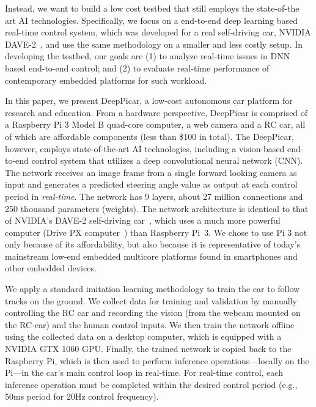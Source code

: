 Instead, we want to build a low cost testbed that still employs the
state-of-the art AI technologies. Specifically, we focus on a end-to-end
deep learning based real-time control system,
which was developed for a real self-driving car, NVIDIA
DAVE-2~\cite{Bojarski2016}, and use the same methodology on a
smaller and less costly setup. In developing the testbed, our
goals are (1) to analyze real-time issues in DNN based end-to-end
control; and (2) to evaluate real-time performance of contemporary embedded
platforms for such workload.

In this paper, we present DeepPicar, a low-cost autonomous car
platform for research and education. From a hardware perspective,
DeepPicar is comprised of a Raspberry Pi 3 Model B quad-core
computer, a web camera and a RC car, all of which are affordable
components (less than \$100 in total).
The DeepPicar, however, employs state-of-the-art AI
technologies, including a vision-based end-to-end control system that
utilizes a deep convolutional neural network (CNN).
The network receives an image frame from a single forward
looking camera as input and generates a predicted steering angle
value as output at each control period in \emph{real-time}.
The network has 9 layers, about 27 million connections
and 250 thousand parameters (weights).
The network architecture is identical to that of NVIDIA's DAVE-2
self-driving car~\cite{Bojarski2016}, which uses a much more powerful
computer (Drive PX computer~\cite{drivepx}) than Raspberry Pi~3.
We chose to use Pi 3 not only because of its
affordability, but also because it is representative
of today's mainstream low-end embedded multicore platforms found in
smartphones and other embedded devices.


We apply a standard imitation learning methodology to train the car to
follow tracks on the ground. We collect data for
training and validation by manually
controlling the RC car and recording the vision (from the webcam
mounted on the RC-car) and the human control inputs. We then train the
network offline using the collected data on a desktop computer, which
is equipped with a NVIDIA GTX 1060 GPU. Finally, the trained network is copied
back to the Raspberry Pi, which is then used to perform inference
operations---locally on the Pi---in the car's main control loop in
real-time. For real-time control, each inference operation must
be completed within the desired control period (e.g., 50ms period for
20Hz control frequency).

